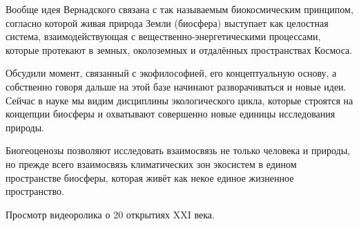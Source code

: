 \documentclass[main.tex]{subfiles}
\begin{document}
Вообще идея Вернадского связана с так называемым биокосмическим принципом, согласно которой живая природа Земли (биосфера) выступает как целостная система, взаимодействующая с вещественно-энергетическими процессами, которые протекают в земных, околоземных и отдалённых пространствах Космоса.

Обсудили момент, связанный с экофилософией, его концептуальную основу, а собственно говоря дальше на этой базе начинают разворачиваться и новые идеи.
Сейчас в науке мы видим дисциплины экологического цикла, которые строятся на концепции биосферы и охватывают совершенно новые единицы исследования природы.

Биогеоценозы позволяют исследовать взаимосвязь не только человека и природы, но прежде всего взаимосвязь климатических зон экосистем в едином пространстве биосферы, которая живёт как некое единое жизненное пространство.


Просмотр видеоролика о 20 открытиях XXI века.
\end{document}

